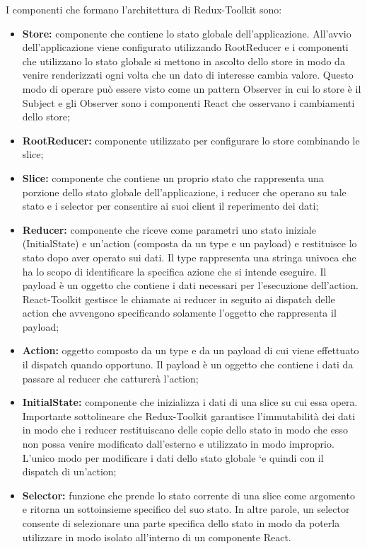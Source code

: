 I componenti che formano l’architettura di Redux-Toolkit sono:
\begin{itemize}
    \item \textbf{Store:} componente che contiene lo stato globale dell’applicazione.
    All’avvio dell’applicazione viene configurato utilizzando RootReducer e i componenti che utilizzano
    lo stato globale si mettono in ascolto dello store in modo da venire renderizzati ogni volta che un dato
    di interesse cambia valore. Questo modo di operare può essere visto come un pattern Observer in
    cui lo store è il Subject e gli Observer sono i componenti React che osservano i cambiamenti dello store;
    \item \textbf{RootReducer:} componente utilizzato per configurare lo store combinando le slice;
    \item \textbf{Slice:} componente che contiene un proprio stato che rappresenta una porzione dello stato globale
    dell’applicazione, i reducer che operano su tale stato e i selector per consentire ai suoi client il
    reperimento dei dati;
    \item \textbf{Reducer:} componente che riceve come parametri uno stato iniziale (InitialState) e un'action
    (composta da un type e un payload) e restituisce lo stato dopo aver operato sui dati. 
    Il type rappresenta una stringa univoca che ha lo scopo di identificare la specifica azione che si intende eseguire.
    Il payload è un oggetto che contiene i dati necessari per l'esecuzione dell'action.
    React-Toolkit gestisce le chiamate ai reducer in seguito ai dispatch delle action che avvengono
    specificando solamente l’oggetto che rappresenta il payload;
    \item \textbf{Action:} oggetto composto da un type e da un payload di cui viene effettuato il dispatch quando
    opportuno. Il payload è un oggetto che contiene i dati da passare al reducer che catturerà l’action;
    \item \textbf{InitialState:} componente che inizializza i dati di una slice su cui essa opera.
    Importante sottolineare che Redux-Toolkit garantisce l’immutabilità dei dati in modo che i reducer restituiscano delle copie dello stato in modo che esso non possa venire
    modificato dall’esterno e utilizzato in modo improprio.
    L’unico modo per modificare i dati dello stato globale `e quindi con il dispatch di un’action;
    \item \textbf{Selector:} funzione che prende lo stato corrente di una slice come argomento e ritorna un sottoinsieme
    specifico del suo stato. In altre parole, un selector consente di selezionare una parte specifica
    dello stato in modo da poterla utilizzare in modo isolato all’interno di un componente React.
\end{itemize}

